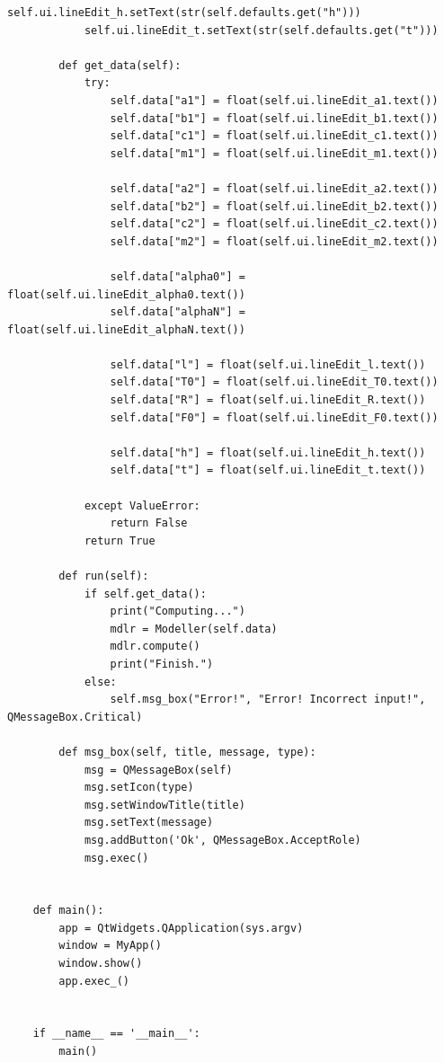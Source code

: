 \documentclass[a4paper,14pt]{article}
\begin{document}
\begin{lstlisting}[label=code1,caption=\text{Класс MyApp.}]
			self.ui.lineEdit_h.setText(str(self.defaults.get("h")))
			self.ui.lineEdit_t.setText(str(self.defaults.get("t")))
	
		def get_data(self):
			try:
				self.data["a1"] = float(self.ui.lineEdit_a1.text())
				self.data["b1"] = float(self.ui.lineEdit_b1.text())
				self.data["c1"] = float(self.ui.lineEdit_c1.text())
				self.data["m1"] = float(self.ui.lineEdit_m1.text())
	
				self.data["a2"] = float(self.ui.lineEdit_a2.text())
				self.data["b2"] = float(self.ui.lineEdit_b2.text())
				self.data["c2"] = float(self.ui.lineEdit_c2.text())
				self.data["m2"] = float(self.ui.lineEdit_m2.text())
	
				self.data["alpha0"] = float(self.ui.lineEdit_alpha0.text())
				self.data["alphaN"] = float(self.ui.lineEdit_alphaN.text())
	
				self.data["l"] = float(self.ui.lineEdit_l.text())
				self.data["T0"] = float(self.ui.lineEdit_T0.text())
				self.data["R"] = float(self.ui.lineEdit_R.text())
				self.data["F0"] = float(self.ui.lineEdit_F0.text())
	
				self.data["h"] = float(self.ui.lineEdit_h.text())
				self.data["t"] = float(self.ui.lineEdit_t.text())
	
			except ValueError:
				return False
			return True
	
		def run(self):
			if self.get_data():
				print("Computing...")
				mdlr = Modeller(self.data)
				mdlr.compute()
				print("Finish.")
			else:
				self.msg_box("Error!", "Error! Incorrect input!", QMessageBox.Critical)
	
		def msg_box(self, title, message, type):
			msg = QMessageBox(self)
			msg.setIcon(type)
			msg.setWindowTitle(title)
			msg.setText(message)
			msg.addButton('Ok', QMessageBox.AcceptRole)
			msg.exec()
	
	
	def main():
		app = QtWidgets.QApplication(sys.argv)
		window = MyApp()
		window.show()
		app.exec_()
	
	
	if __name__ == '__main__':
		main()	
\end{lstlisting}
\end{document}
